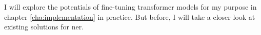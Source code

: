 I will explore the potentials of fine-tuning transformer models for my purpose in chapter \ref{cha:implementation} in practice. But before, I will take a closer look at existing solutions for \gls{ner}. 



 

